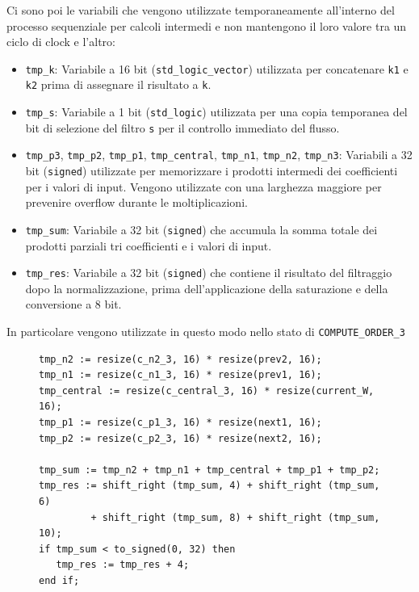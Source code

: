 \documentclass{article}
\begin{document}
\noindent Ci sono poi le variabili che vengono utilizzate temporaneamente all'interno del processo sequenziale per calcoli intermedi e non mantengono il loro valore tra un ciclo di clock e l'altro:
\begin{itemize}
    \item \texttt{tmp\_k}: Variabile a 16 bit (\texttt{std\_logic\_vector}) utilizzata per concatenare \texttt{k1} e \texttt{k2} prima di assegnare il risultato a \texttt{k}.
    \item \texttt{tmp\_s}: Variabile a 1 bit (\texttt{std\_logic}) utilizzata per una copia temporanea del bit di selezione del filtro \texttt{s} per il controllo immediato del flusso.
    \item \texttt{tmp\_p3}, \texttt{tmp\_p2}, \texttt{tmp\_p1}, \texttt{tmp\_central}, \texttt{tmp\_n1}, \texttt{tmp\_n2}, \texttt{tmp\_n3}: Variabili a 32 bit (\texttt{signed}) utilizzate per memorizzare i prodotti intermedi dei coefficienti per i valori di input. Vengono utilizzate con una larghezza maggiore per prevenire overflow durante le moltiplicazioni.
    \item \texttt{tmp\_sum}: Variabile a 32 bit (\texttt{signed}) che accumula la somma totale dei prodotti parziali tri coefficienti e i valori di input.
    \item \texttt{tmp\_res}: Variabile a 32 bit (\texttt{signed}) che contiene il risultato del filtraggio dopo la normalizzazione, prima dell'applicazione della saturazione e della conversione a 8 bit.
\end{itemize}
In particolare vengono utilizzate in questo modo nello stato di \texttt{COMPUTE\_ORDER\_3}

\begin{figure}[h!]
    \centering
    \begin{lstlisting}[caption=Calcolo mediante variabili temporanee]
tmp_n2 := resize(c_n2_3, 16) * resize(prev2, 16);
tmp_n1 := resize(c_n1_3, 16) * resize(prev1, 16);
tmp_central := resize(c_central_3, 16) * resize(current_W, 16);
tmp_p1 := resize(c_p1_3, 16) * resize(next1, 16);
tmp_p2 := resize(c_p2_3, 16) * resize(next2, 16);

tmp_sum := tmp_n2 + tmp_n1 + tmp_central + tmp_p1 + tmp_p2;
tmp_res := shift_right (tmp_sum, 4) + shift_right (tmp_sum, 6) 
         + shift_right (tmp_sum, 8) + shift_right (tmp_sum, 10);
if tmp_sum < to_signed(0, 32) then
   tmp_res := tmp_res + 4;
end if;
    \end{lstlisting}
\end{figure}
\end{document}
